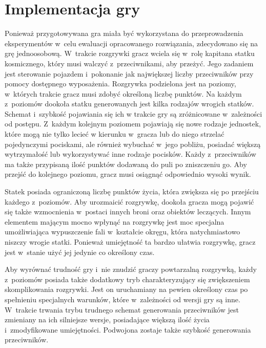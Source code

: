 \section{Implementacja gry}
Ponieważ przygotowywana gra miała być wykorzystana do przeprowadzenia eksperymentów w~celu ewaluacji opracowanego rozwiązania, zdecydowano się na grę jednoosobową. W~trakcie rozgrywki gracz wciela się w~rolę kapitana statku kosmicznego, który musi walczyć z~przeciwnikami, aby przeżyć. Jego zadaniem jest sterowanie pojazdem i~pokonanie jak największej liczby przeciwników przy pomocy dostępnego wyposażenia. Rozgrywka podzielona jest na poziomy, w~których trakcie gracz musi zdobyć określoną liczbę punktów. Na każdym z~poziomów dookoła statku generowanych jest kilka rodzajów wrogich statków. Schemat i~szybkość pojawiania się ich w trakcie gry są zróżnicowane w~zależności od postępu. Z~każdym kolejnym poziomem pojawiają się nowe rodzaje jednostek, które mogą nie tylko lecieć w kierunku w~gracza lub do niego strzelać pojedynczymi pociskami, ale również wybuchać w~jego pobliżu, posiadać większą wytrzymałość lub wykorzystywać inne rodzaje pocisków. Każdy z~przeciwników ma także przypisaną ilość punktów dodawaną do puli po zniszczeniu go. Aby przejść do kolejnego poziomu, gracz musi osiągnąć odpowiednio wysoki wynik.

Statek posiada ograniczoną liczbę punktów życia, która zwiększa się po przejściu każdego z~poziomów. Aby urozmaicić rozgrywkę, dookoła gracza mogą pojawić się także wzmocnienia w~postaci innych broni oraz obiektów leczących. Innym elementem mającym mocno wpłynąć na rozgrywkę jest moc specjalna umożliwiająca wypuszczenie fali w~kształcie okręgu, która natychmiastowo niszczy wrogie statki. Ponieważ umiejętność ta bardzo ułatwia rozgrywkę, gracz jest w~stanie użyć jej jedynie co określony czas. 

Aby wyrównać trudność gry i~nie znudzić graczy powtarzalną rozgrywką, każdy z~poziomów posiada także dodatkowy tryb charakteryzujący się zwiększeniem skomplikowania rozgrywki. Jest on uruchamiany na pewien określony czas po spełnieniu specjalnych warunków, które w~zależności od wersji gry są inne. W~trakcie trwania trybu trudnego schemat generowania przeciwników jest zmieniany na ich silniejsze wersje, posiadające większą ilość życia i~zmodyfikowane umiejętności. Podwojona zostaje także szybkość generowania przeciwników.

